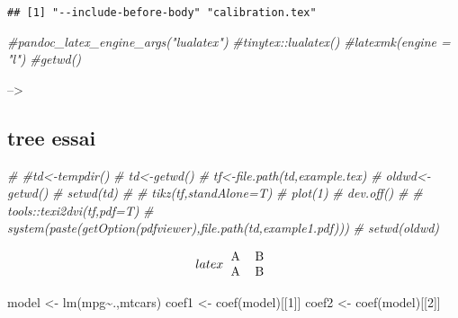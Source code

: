 \documentclass[
]{article}
\newenvironment{Shaded}{\begin{snugshade}}{\end{snugshade}}
\newcommand{\CommentTok}[1]{\textcolor[rgb]{0.56,0.35,0.01}{\textit{#1}}}
\newcommand{\DecValTok}[1]{\textcolor[rgb]{0.00,0.00,0.81}{#1}}
\newcommand{\FunctionTok}[1]{\textcolor[rgb]{0.00,0.00,0.00}{#1}}
\newcommand{\NormalTok}[1]{#1}
\newcommand{\OtherTok}[1]{\textcolor[rgb]{0.56,0.35,0.01}{#1}}
\newcommand{\SpecialCharTok}[1]{\textcolor[rgb]{0.00,0.00,0.00}{#1}}
\begin{document}
\begin{verbatim}
## [1] "--include-before-body" "calibration.tex"
\end{verbatim}

\begin{Shaded}
\begin{Highlighting}[]
\CommentTok{\#pandoc\_latex\_engine\_args("lualatex")}
\CommentTok{\#tinytex::lualatex()}
\CommentTok{\#latexmk(engine = "l")}
\CommentTok{\#getwd()}
\end{Highlighting}
\end{Shaded}

--\textgreater{}

\hypertarget{tree-essai}{%
\subsection{tree essai}\label{tree-essai}}

\begin{Shaded}
\begin{Highlighting}[]
\CommentTok{\# \#td\textless{}{-}tempdir()}
\CommentTok{\# td\textless{}{-}getwd()}
\CommentTok{\# tf\textless{}{-}file.path(td,\textquotesingle{}example.tex\textquotesingle{})}
\CommentTok{\# oldwd\textless{}{-}getwd()}
\CommentTok{\# setwd(td)}
\CommentTok{\# }
\CommentTok{\# tikz(tf,standAlone=T)}
\CommentTok{\# plot(1)}
\CommentTok{\# dev.off()}
\CommentTok{\# }
\CommentTok{\# tools::texi2dvi(tf,pdf=T)}
\CommentTok{\# system(paste(getOption(\textquotesingle{}pdfviewer\textquotesingle{}),file.path(td,\textquotesingle{}example1.pdf\textquotesingle{})))}
\CommentTok{\# setwd(oldwd)}
\end{Highlighting}
\end{Shaded}

\[latex
\begin{tabular}{ll}
A & B \\
A & B \\
\end{tabular}\]

\begin{Shaded}
\begin{Highlighting}[]
\NormalTok{model }\OtherTok{\textless{}{-}} \FunctionTok{lm}\NormalTok{(mpg}\SpecialCharTok{\textasciitilde{}}\NormalTok{.,mtcars)}
\NormalTok{ coef1 }\OtherTok{\textless{}{-}} \FunctionTok{coef}\NormalTok{(model)[[}\DecValTok{1}\NormalTok{]]}
\NormalTok{ coef2 }\OtherTok{\textless{}{-}} \FunctionTok{coef}\NormalTok{(model)[[}\DecValTok{2}\NormalTok{]]}
\end{Highlighting}
\end{Shaded}
\end{document}
